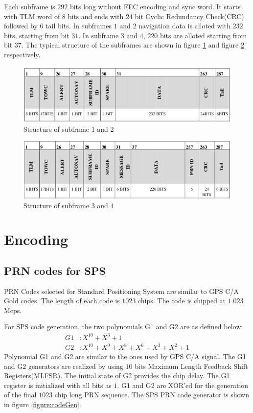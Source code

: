 \noindent Each subframe is $292$ bits long without FEC encoding and sync word. It starts with TLM word of 8 bits and ends with $24$ bit Cyclic Redundancy Check(CRC) followed by $6$ tail bits. In subframes $1$ and $2$ navigation data is alloted with $232$ bits, starting from bit $31$. In subframe $3$ and $4$, $220$ bits are alloted starting from bit $37$. The typical structure of the subframes are shown in figure \ref{fig:frame_1_2} and figure \ref{fig:frame_3_4} respectively.

\begin{figure}[ht]
\centering
\includegraphics[width=0.8\columnwidth]{figs/1_2.png}
\centering
\captionsetup{justification=centering}
\caption{Structure of subframe 1 and 2}
\label{fig:frame_1_2}
\end{figure}

\begin{figure}[ht]
\centering
\includegraphics[width=0.8\columnwidth]{figs/3_4.png}
\centering
\captionsetup{justification=centering}
\caption{Structure of subframe 3 and 4}
\label{fig:frame_3_4}
\end{figure}

\section{Encoding}
\subsection{PRN codes for SPS}
PRN Codes selected for Standard Positioning System are similar to GPS C/A Gold codes. The length of each code is $1023$ chips. The code is chipped at $1.023$ Mcps.

\noindent For SPS code generation, the two polynomials G1 and G2 are as defined below:
\begin{align}
G1 &: X^{10}+X^{3} + 1\\
G2 &: X^{10}+X^9+X^8+X^6+X^3+X^2+1
\end{align}
Polynomial G1 and G2 are similar to the ones used by GPS C/A signal. The G1 and G2 generators are realized by using $10$ bits Maximum Length Feedback Shift Registers(MLFSR). The initial state of G2 provides the chip delay. The G1 register is initialized with all bits as $1$. G1 and G2 are XOR'ed for the generation of the final $1023$ chip long PRN sequence. The SPS PRN code generator is shown in figure \ref{figure:codeGen}.

